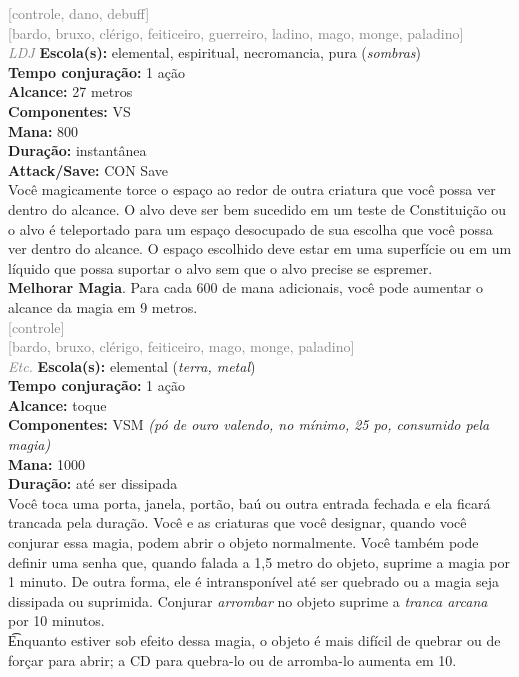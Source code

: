 \documentclass{RPG_Adventure}[2021/10/20]
\begin{document}
{\scriptsize \textcolor{gray}{[controle, dano, debuff]\\}}
{\scriptsize \textcolor{gray}{[bardo, bruxo, clérigo, feiticeiro, guerreiro, ladino, mago, monge, paladino]\\}}
{\tiny \textcolor{gray}{\textit{LDJ}}}
{\small \t \textbf{Escola(s):} elemental, espiritual, necromancia, pura (\textit{sombras})\\\t \textbf{Tempo conjuração:} 1 ação\\\t \textbf{Alcance:} 27 metros\\\t \textbf{Componentes:} VS\\\t \textbf{Mana:} 800\\\t \textbf{Duração:} instantânea\\\t \textbf{Attack/Save:} CON Save\\}
{\normalsize Você magicamente torce o espaço ao redor de outra criatura que você possa ver dentro do alcance. O alvo deve ser bem sucedido em um teste de Constituição ou o alvo é teleportado para um espaço desocupado de sua escolha que você possa ver dentro do alcance. O espaço escolhido deve estar em uma superfície ou em um líquido que possa suportar o alvo sem que o alvo precise se espremer.\\\t \textbf{Melhorar Magia}. Para cada 600 de mana adicionais, você pode aumentar o alcance da magia em 9 metros.\\}
{\scriptsize \textcolor{gray}{[controle]\\}}
{\scriptsize \textcolor{gray}{[bardo, bruxo, clérigo, feiticeiro, mago, monge, paladino]\\}}
{\tiny \textcolor{gray}{\textit{Etc.}}}
{\small \t \textbf{Escola(s):} elemental (\textit{terra, metal})\\\t \textbf{Tempo conjuração:} 1 ação\\\t \textbf{Alcance:} toque\\\t \textbf{Componentes:} VSM \textit{(pó de ouro valendo, no mínimo, 25 po, consumido pela magia)}\\\t \textbf{Mana:} 1000\\\t \textbf{Duração:} até ser dissipada\\}
{\normalsize Você toca uma porta, janela, portão, baú ou outra entrada fechada e ela ficará trancada pela duração. Você e as criaturas que você designar, quando você conjurar essa magia, podem abrir o objeto normalmente. Você também pode definir uma senha que, quando falada a 1,5 metro do objeto, suprime a magia por 1 minuto. De outra forma, ele é intransponível até ser quebrado ou a magia seja dissipada ou suprimida. Conjurar \textit{arrombar} no objeto suprime a \textit{tranca arcana} por 10 minutos.\\\t Enquanto estiver sob efeito dessa magia, o objeto é mais difícil de quebrar ou de forçar para abrir; a CD para quebra-lo ou de arromba-lo aumenta em 10.\\}
\end{document}
